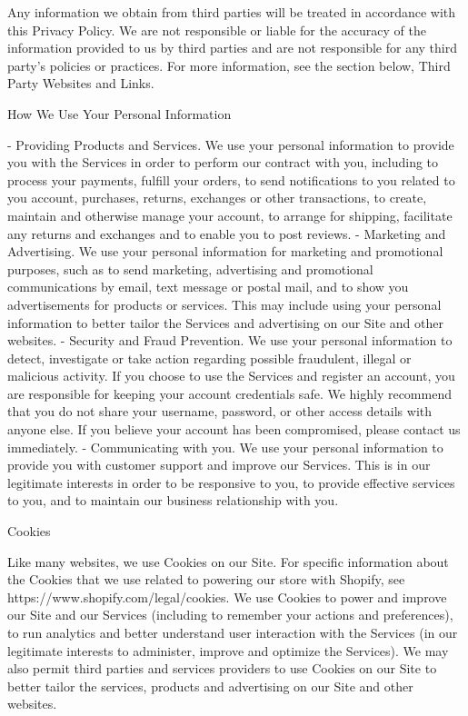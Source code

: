\documentclass[conference]{IEEEtran}
\begin{document}
Any information we obtain from third parties will be treated in accordance with this Privacy Policy. We are not responsible or liable for the accuracy of the information provided to us by third parties and are not responsible for any third party's policies or practices. For more information, see the section below, Third Party Websites and Links.

How We Use Your Personal Information

- Providing Products and Services. We use your personal information to provide you with the Services in order to perform our contract with you, including to process your payments, fulfill your orders, to send notifications to you related to you account, purchases, returns, exchanges or other transactions, to create, maintain and otherwise manage your account, to arrange for shipping, facilitate any returns and exchanges and to enable you to post reviews.
- Marketing and Advertising. We use your personal information for marketing and promotional purposes, such as to send marketing, advertising and promotional communications by email, text message or postal mail, and to show you advertisements for products or services. This may include using your personal information to better tailor the Services and advertising on our Site and other websites.
- Security and Fraud Prevention. We use your personal information to detect, investigate or take action regarding possible fraudulent, illegal or malicious activity. If you choose to use the Services and register an account, you are responsible for keeping your account credentials safe. We highly recommend that you do not share your username, password, or other access details with anyone else. If you believe your account has been compromised, please contact us immediately.
- Communicating with you. We use your personal information to provide you with customer support and improve our Services. This is in our legitimate interests in order to be responsive to you, to provide effective services to you, and to maintain our business relationship with you.

Cookies

Like many websites, we use Cookies on our Site. For specific information about the Cookies that we use related to powering our store with Shopify, see https://www.shopify.com/legal/cookies. We use Cookies to power and improve our Site and our Services (including to remember your actions and preferences), to run analytics and better understand user interaction with the Services (in our legitimate interests to administer, improve and optimize the Services). We may also permit third parties and services providers to use Cookies on our Site to better tailor the services, products and advertising on our Site and other websites.
\end{document}
